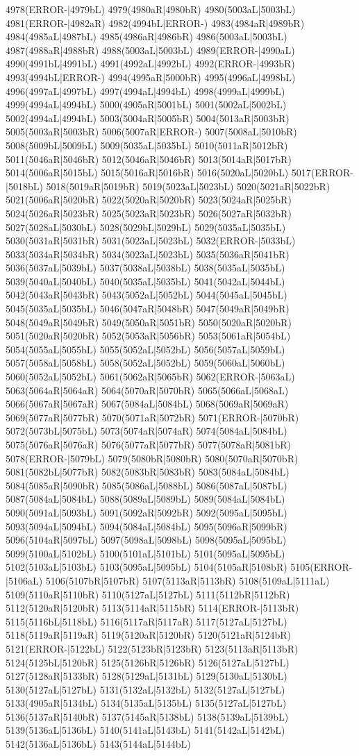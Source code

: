 4978(ERROR-|4979bL) 4979(4980aR|4980bR) 4980(5003aL|5003bL) 4981(ERROR-|4982aR) 4982(4994bL|ERROR-) 4983(4984aR|4989bR) 4984(4985aL|4987bL) 4985(4986aR|4986bR) 4986(5003aL|5003bL) 4987(4988aR|4988bR) 4988(5003aL|5003bL) 4989(ERROR-|4990aL) 4990(4991bL|4991bL) 4991(4992aL|4992bL) 4992(ERROR-|4993bR) 4993(4994bL|ERROR-) 4994(4995aR|5000bR) 4995(4996aL|4998bL) 4996(4997aL|4997bL) 4997(4994aL|4994bL) 4998(4999aL|4999bL) 4999(4994aL|4994bL) 5000(4905aR|5001bL) 5001(5002aL|5002bL) 5002(4994aL|4994bL) 5003(5004aR|5005bR) 5004(5013aR|5003bR) 5005(5003aR|5003bR) 5006(5007aR|ERROR-) 5007(5008aL|5010bR) 5008(5009bL|5009bL) 5009(5035aL|5035bL) 5010(5011aR|5012bR) 5011(5046aR|5046bR) 5012(5046aR|5046bR) 5013(5014aR|5017bR) 5014(5006aR|5015bL) 5015(5016aR|5016bR) 5016(5020aL|5020bL) 5017(ERROR-|5018bL) 5018(5019aR|5019bR) 5019(5023aL|5023bL) 5020(5021aR|5022bR) 5021(5006aR|5020bR) 5022(5020aR|5020bR) 5023(5024aR|5025bR) 5024(5026aR|5023bR) 5025(5023aR|5023bR) 5026(5027aR|5032bR) 5027(5028aL|5030bL) 5028(5029bL|5029bL) 5029(5035aL|5035bL) 5030(5031aR|5031bR) 5031(5023aL|5023bL) 5032(ERROR-|5033bL) 5033(5034aR|5034bR) 5034(5023aL|5023bL) 5035(5036aR|5041bR) 5036(5037aL|5039bL) 5037(5038aL|5038bL) 5038(5035aL|5035bL) 5039(5040aL|5040bL) 5040(5035aL|5035bL) 5041(5042aL|5044bL) 5042(5043aR|5043bR) 5043(5052aL|5052bL) 5044(5045aL|5045bL) 5045(5035aL|5035bL) 5046(5047aR|5048bR) 5047(5049aR|5049bR) 5048(5049aR|5049bR) 5049(5050aR|5051bR) 5050(5020aR|5020bR) 5051(5020aR|5020bR) 5052(5053aR|5056bR) 5053(5061aR|5054bL) 5054(5055aL|5055bL) 5055(5052aL|5052bL) 5056(5057aL|5059bL) 5057(5058aL|5058bL) 5058(5052aL|5052bL) 5059(5060aL|5060bL) 5060(5052aL|5052bL) 5061(5062aR|5065bR) 5062(ERROR-|5063aL) 5063(5064aR|5064aR) 5064(5070aR|5070bR) 5065(5066aL|5068aL) 5066(5067aR|5067aR) 5067(5084aL|5084bL) 5068(5069aR|5069aR) 5069(5077aR|5077bR) 5070(5071aR|5072bR) 5071(ERROR-|5070bR) 5072(5073bL|5075bL) 5073(5074aR|5074aR) 5074(5084aL|5084bL) 5075(5076aR|5076aR) 5076(5077aR|5077bR) 5077(5078aR|5081bR) 5078(ERROR-|5079bL) 5079(5080bR|5080bR) 5080(5070aR|5070bR) 5081(5082bL|5077bR) 5082(5083bR|5083bR) 5083(5084aL|5084bL) 5084(5085aR|5090bR) 5085(5086aL|5088bL) 5086(5087aL|5087bL) 5087(5084aL|5084bL) 5088(5089aL|5089bL) 5089(5084aL|5084bL) 5090(5091aL|5093bL) 5091(5092aR|5092bR) 5092(5095aL|5095bL) 5093(5094aL|5094bL) 5094(5084aL|5084bL) 5095(5096aR|5099bR) 5096(5104aR|5097bL) 5097(5098aL|5098bL) 5098(5095aL|5095bL) 5099(5100aL|5102bL) 5100(5101aL|5101bL) 5101(5095aL|5095bL) 5102(5103aL|5103bL) 5103(5095aL|5095bL) 5104(5105aR|5108bR) 5105(ERROR-|5106aL) 5106(5107bR|5107bR) 5107(5113aR|5113bR) 5108(5109aL|5111aL) 5109(5110aR|5110bR) 5110(5127aL|5127bL) 5111(5112bR|5112bR) 5112(5120aR|5120bR) 5113(5114aR|5115bR) 5114(ERROR-|5113bR) 5115(5116bL|5118bL) 5116(5117aR|5117aR) 5117(5127aL|5127bL) 5118(5119aR|5119aR) 5119(5120aR|5120bR) 5120(5121aR|5124bR) 5121(ERROR-|5122bL) 5122(5123bR|5123bR) 5123(5113aR|5113bR) 5124(5125bL|5120bR) 5125(5126bR|5126bR) 5126(5127aL|5127bL) 5127(5128aR|5133bR) 5128(5129aL|5131bL) 5129(5130aL|5130bL) 5130(5127aL|5127bL) 5131(5132aL|5132bL) 5132(5127aL|5127bL) 5133(4905aR|5134bL) 5134(5135aL|5135bL) 5135(5127aL|5127bL) 5136(5137aR|5140bR) 5137(5145aR|5138bL) 5138(5139aL|5139bL) 5139(5136aL|5136bL) 5140(5141aL|5143bL) 5141(5142aL|5142bL) 5142(5136aL|5136bL) 5143(5144aL|5144bL) 
